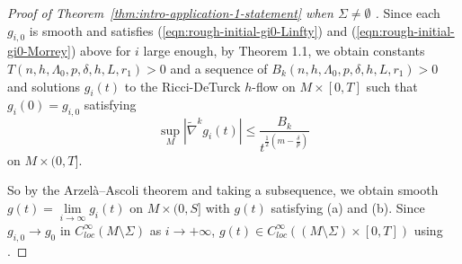 \documentclass[12pt]{amsart}
\theoremstyle{plain}
\theoremstyle{plain}
\theoremstyle{definition}
\theoremstyle{remark}
\numberwithin{equation}{subsection}
\newcommand{\hdel}{\tilde{\nabla}}
\begin{document}
\begin{proof}[Proof of Theorem~\ref{thm:intro-application-1-statement} when $\Sigma\neq \emptyset$ ]
    Since each $g_{i,0}$ is smooth and satisfies (\ref{eqn:rough-initial-gi0-Linfty}) and (\ref{eqn:rough-initial-gi0-Morrey}) above for $i$ large enough, by Theorem 1.1, we obtain constants $T(n,h,\Lambda_0,p,\delta,h,L,r_1) > 0$ and a sequence of $B_k(n,h,\Lambda_0,p,\delta,h,L,r_1) > 0$ and solutions $g_i(t)$ to the Ricci-DeTurck $h$-flow on $M \times [0,T]$ such that $g_i(0) = g_{i,0}$ satisfying
$$\sup\limits_{M}|\hdel^k g_i(t)| \leq \frac{B_k}{t^{\frac{1}{2}(m-\frac{\delta}{p})}}$$ on $M \times (0,T]$.


So by the Arzel\`a--Ascoli theorem and taking a subsequence, we obtain smooth $g(t) = \lim\limits_{i\to\infty}g_i(t)$ on $M \times (0,S]$ with $g(t)$ satisfying (a) and (b). Since $g_{i,0}\to g_0$ in $C^\infty_{loc}(M\setminus \Sigma)$ as $i\to+\infty$, $g(t)\in C^\infty_{loc}\left((M\setminus \Sigma)\times [0,T]\right)$ using \cite[Proposition 2.2]{chu_ricci-deturck_2022}. 


\end{proof}
\end{document}
